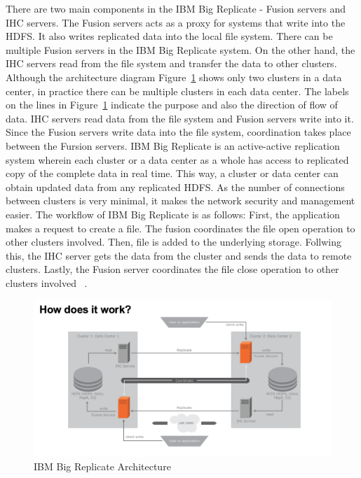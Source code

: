 There are two main components in the IBM Big Replicate - Fusion servers and IHC 
servers. The Fusion servers acts as a proxy for systems that write into the 
HDFS. It also writes replicated data into the local file system. There can be 
multiple Fusion servers in the IBM Big Replicate system. On the other hand, the 
IHC servers read from the file system and transfer the data to other clusters.
Although the architecture diagram Figure~\ref{f:architecture} shows only two 
clusters in a data center, in practice there can be multiple clusters in each 
data center. The labels on the lines in Figure~\ref{f:architecture} indicate the
purpose and also the direction of flow of data. IHC servers read data from the 
file system and Fusion servers write into it. Since the Fusion servers write
data into the file system, coordination takes place between the Fursion servers.
IBM Big Replicate is an active-active replication system wherein each cluster or
a data center as a whole has access to replicated copy of the complete data in 
real time. This way, a cluster or data center can obtain updated data from any 
replicated HDFS. As the number of connections between clusters is very minimal,
it makes the network security and management easier. The workflow of IBM Big 
Replicate is as follows:
First, the application makes a request to create a file. The fusion coordinates 
the file open operation to other clusters involved. Then, file is added to the 
underlying storage. Follwing this, the IHC server gets the data from the cluster
and sends the data to remote clusters. Lastly, the Fusion server coordinates the
file close operation to other clusters involved 
~\cite{hid-sp18-408-IBMBigReplicate-architecture}.

\begin{figure}[!ht]
  \centering\includegraphics[width=\columnwidth]
  {image/IBM-Replicate-Architecture.png}
  \caption{IBM Big Replicate Architecture
  ~\cite{hid-sp18-408-IBMBigReplicate-architecture}}\label{f:architecture}
\end{figure}

